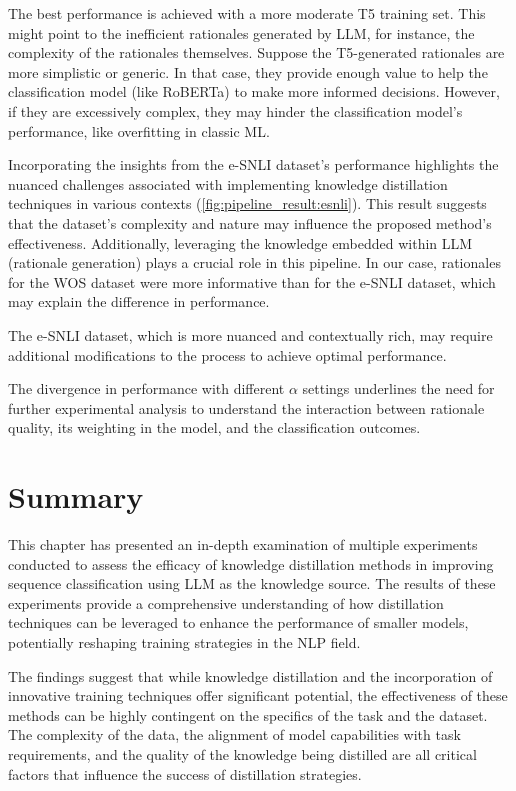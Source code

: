 The best performance is achieved with a more moderate T5 training set. This might point to the inefficient rationales generated by LLM, for instance, the complexity of the rationales themselves. Suppose the T5-generated rationales are more simplistic or generic. In that case, they provide enough value to help the classification model (like RoBERTa) to make more informed decisions. However, if they are excessively complex, they may hinder the classification model's performance, like overfitting in classic ML\@.

Incorporating the insights from the e-SNLI dataset's performance highlights the nuanced challenges associated with implementing knowledge distillation techniques in various contexts (\autoref{fig:pipeline_result:esnli}). This result suggests that the dataset's complexity and nature may influence the proposed method's effectiveness. Additionally, leveraging the knowledge embedded within LLM (rationale generation) plays a crucial role in this pipeline. In our case, rationales for the WOS dataset were more informative than for the e-SNLI dataset, which may explain the difference in performance.

The e-SNLI dataset, which is more nuanced and contextually rich, may require additional modifications to the process to achieve optimal performance.

The divergence in performance with different $\alpha$ settings underlines the need for further experimental analysis to understand the interaction between rationale quality, its weighting in the model, and the classification outcomes.

\section{Summary}

This chapter has presented an in-depth examination of multiple experiments conducted to assess the efficacy of knowledge distillation methods in improving sequence classification using LLM as the knowledge source. The results of these experiments provide a comprehensive understanding of how distillation techniques can be leveraged to enhance the performance of smaller models, potentially reshaping training strategies in the NLP field.

The findings suggest that while knowledge distillation and the incorporation of innovative training techniques offer significant potential, the effectiveness of these methods can be highly contingent on the specifics of the task and the dataset. The complexity of the data, the alignment of model capabilities with task requirements, and the quality of the knowledge being distilled are all critical factors that influence the success of distillation strategies.
